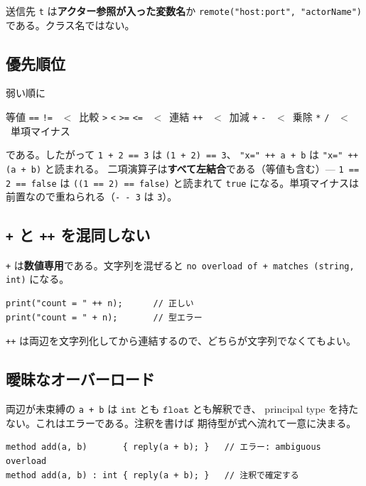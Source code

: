 \documentclass[11pt,a4paper]{ltjsarticle}
\newcommand{\ty}[1]{\ensuremath{\mathtt{#1}}}
\begin{document}
送信先 \texttt{t} は\textbf{アクター参照が入った変数名}か
\texttt{remote("host:port", "actorName")} である。クラス名ではない。

\subsection{優先順位}

弱い順に

\begin{center}
等値 \texttt{==} \texttt{!=} \ $<$\ 比較 \texttt{>} \texttt{<} \texttt{>=} \texttt{<=}
\ $<$\ 連結 \texttt{++} \ $<$\ 加減 \texttt{+} \texttt{-}
\ $<$\ 乗除 \texttt{*} \texttt{/} \ $<$\ 単項マイナス
\end{center}

である。したがって \texttt{1 + 2 == 3} は \texttt{(1 + 2) == 3}、
\texttt{"x=" ++ a + b} は \texttt{"x=" ++ (a + b)} と読まれる。
二項演算子は\textbf{すべて左結合}である（等値も含む）--- \texttt{1 == 2 == false} は \texttt{((1 == 2) == false)} と読まれて \texttt{true} になる。単項マイナスは前置なので重ねられる（\texttt{- - 3} は \texttt{3}）。

\subsection{\texttt{+} と \texttt{++} を混同しない}

\texttt{+} は\textbf{数値専用}である。文字列を混ぜると
\texttt{no overload of + matches (string, int)} になる。

\begin{lstlisting}
print("count = " ++ n);      // 正しい
print("count = " + n);       // 型エラー
\end{lstlisting}

\texttt{++} は両辺を文字列化してから連結するので、どちらが文字列でなくてもよい。

\subsection{曖昧なオーバーロード}

両辺が未束縛の \texttt{a + b} は \ty{int} とも \ty{float} とも解釈でき、
principal type を持たない。これはエラーである。注釈を書けば
期待型が式へ流れて一意に決まる。

\begin{lstlisting}
method add(a, b)       { reply(a + b); }   // エラー: ambiguous overload
method add(a, b) : int { reply(a + b); }   // 注釈で確定する
\end{lstlisting}
\end{document}
